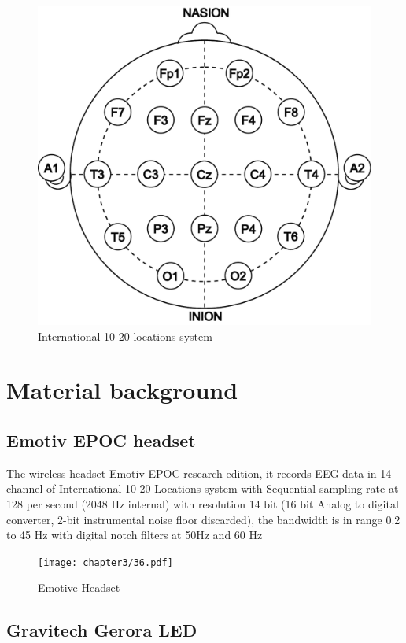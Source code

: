 \begin{figure}[h]
	\centering
	\includegraphics[scale = 0.4]{chapter3/35.pdf}
	\caption{International 10-20 locations system}
\end{figure}

\newpage
\section{Material background}

\subsection{Emotiv EPOC headset\cite{ref12}}

\hspace{1.5cm} The wireless headset Emotiv EPOC research edition, it records EEG data in 14 channel of International 10-20 Locations system with Sequential sampling rate at 128 per second (2048 Hz internal) with resolution 14 bit (16 bit Analog to digital converter, 2-bit instrumental noise floor discarded), the bandwidth is in range 0.2 to 45 Hz with digital notch filters at 50Hz and 60 Hz
\begin{figure}[h]
	\centering
	\texttt{[image: chapter3/36.pdf]}
	\caption{Emotive Headset}
\end{figure}

\subsection{Gravitech Gerora LED\cite{ref13}}

